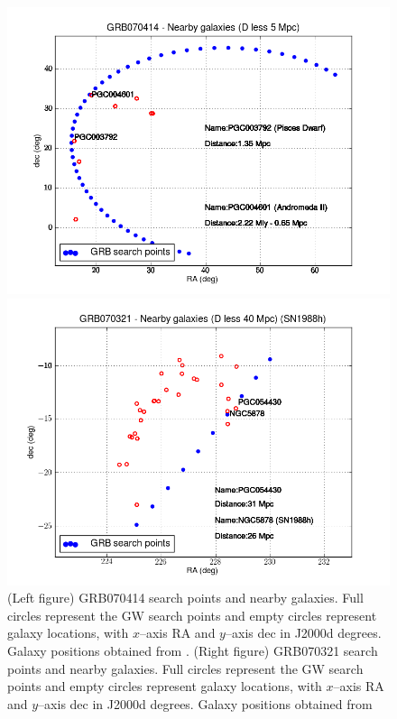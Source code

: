 \begin{figure}[htb]
\begin{minipage}{0.45\linewidth}
\centering
\includegraphics[scale=0.4]{Images/070414_andromeda2.png}
\end{minipage}
\hspace{0.5cm}
\begin{minipage}{0.40\linewidth}
\centering
\includegraphics[scale=0.4]{Images/070321_galaxies.png}
\end{minipage}
\label{ipngrb_galaxies}
\caption{(Left figure) GRB070414 search points and nearby galaxies. Full circles represent the GW search points and empty circles represent galaxy locations, with $x$--axis RA and $y$--axis dec in J2000d degrees. Galaxy positions obtained from \cite{gwgc}. (Right figure) GRB070321 search points and nearby galaxies. Full circles represent the GW search points and empty circles represent galaxy locations, with $x$--axis RA and $y$--axis dec in J2000d degrees. Galaxy positions obtained from \cite{gwgc}}
\end{figure}

